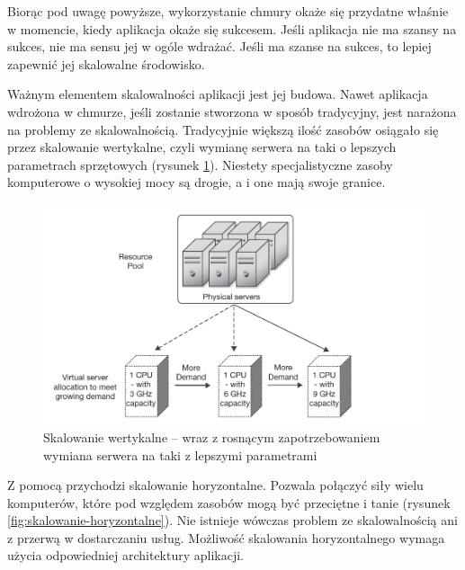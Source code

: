 \documentclass[12pt,a4paper,twoside,titlepage,openright]{book}
\begin{document}
Biorąc pod uwagę powyższe, wykorzystanie chmury okaże się przydatne właśnie w momencie, kiedy aplikacja okaże się sukcesem. Jeśli aplikacja nie ma szansy na sukces, nie ma sensu jej w ogóle  wdrażać. Jeśli ma szanse na sukces, to lepiej zapewnić jej skalowalne środowisko.

Ważnym elementem skalowalności aplikacji jest jej budowa. Nawet aplikacja wdrożona w chmurze, jeśli zostanie stworzona w sposób tradycyjny, jest narażona na problemy ze skalowalnością. Tradycyjnie większą ilość zasobów osiągało się przez skalowanie wertykalne, czyli wymianę serwera na taki o lepszych parametrach sprzętowych (rysunek \ref{fig:skalowanie-wertykalne}). Niestety specjalistyczne zasoby komputerowe o wysokiej mocy są drogie, a i one mają swoje granice. 

\begin{figure}[h!]
	\centering
			\includegraphics[width=\textwidth]{skalowanie-wertykalne.png}
		\caption{Skalowanie wertykalne -- wraz z rosnącym zapotrzebowaniem wymiana serwera na taki z lepszymi parametrami \cite{ccCambridge}}
		\label{fig:skalowanie-wertykalne}
\end{figure}

Z pomocą przychodzi skalowanie horyzontalne. Pozwala połączyć siły wielu komputerów, które pod względem zasobów mogą być przeciętne i tanie (rysunek \ref{fig:skalowanie-horyzontalne}). Nie istnieje wówczas problem ze skalowalnością ani z przerwą w dostarczaniu usług. Możliwość skalowania horyzontalnego wymaga użycia odpowiedniej architektury aplikacji.
\end{document}
